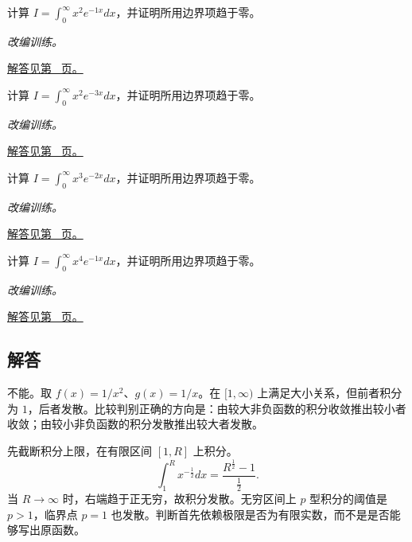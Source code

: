 \documentclass[12pt,fontset=fandol]{ctexart}
\begin{document}
\begin{example}[指数衰减积分的递推]\label{ex:c19q22}
计算 $I=\displaystyle\int_0^\infty x^{2}e^{-1x}dx$，并证明所用边界项趋于零。
\par\textit{改编训练。}\par\hyperref[ans:c19q22]{解答见第~\pageref{ans:c19q22} 页。}
\end{example}
\begin{example}[指数衰减积分的递推]\label{ex:c19q23}
计算 $I=\displaystyle\int_0^\infty x^{2}e^{-3x}dx$，并证明所用边界项趋于零。
\par\textit{改编训练。}\par\hyperref[ans:c19q23]{解答见第~\pageref{ans:c19q23} 页。}
\end{example}
\begin{example}[指数衰减积分的递推]\label{ex:c19q24}
计算 $I=\displaystyle\int_0^\infty x^{3}e^{-2x}dx$，并证明所用边界项趋于零。
\par\textit{改编训练。}\par\hyperref[ans:c19q24]{解答见第~\pageref{ans:c19q24} 页。}
\end{example}
\begin{example}[指数衰减积分的递推]\label{ex:c19q25}
计算 $I=\displaystyle\int_0^\infty x^{4}e^{-1x}dx$，并证明所用边界项趋于零。
\par\textit{改编训练。}\par\hyperref[ans:c19q25]{解答见第~\pageref{ans:c19q25} 页。}
\end{example}
\subsection{解答}
\begin{solve}\label{ans:c19q1}
不能。取 $f(x)=1/x^2$、$g(x)=1/x$。在 $[1,\infty)$ 上满足大小关系，但前者积分为 $1$，后者发散。比较判别正确的方向是：由较大非负函数的积分收敛推出较小者收敛；由较小非负函数的积分发散推出较大者发散。
\end{solve}

\begin{solve}\label{ans:c19q2}
先截断积分上限，在有限区间 $[1,R]$ 上积分。
\[
\int_1^Rx^{-\frac{1}{2}}dx=\frac{R^{\frac{1}{2}}-1}{\frac{1}{2}}.
\]
当 $R\to\infty$ 时，右端趋于正无穷，故积分发散。无穷区间上 $p$ 型积分的阈值是 $p>1$，临界点 $p=1$ 也发散。判断首先依赖极限是否为有限实数，而不是是否能够写出原函数。
\end{solve}
\end{document}
